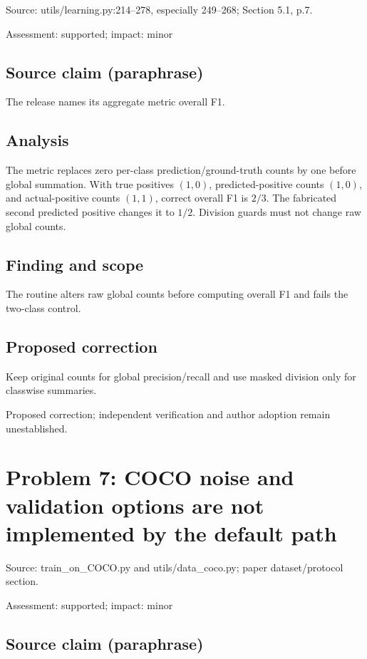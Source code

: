 \documentclass[11pt]{article}
\begin{document}
Source: utils/learning.py:214–278, especially 249–268; Section 5.1, p.7.

Assessment: supported; impact: minor

\subsection*{Source claim (paraphrase)}

The release names its aggregate metric overall F1.

\subsection*{Analysis}

The metric replaces zero per-class prediction/ground-truth counts by one before global summation. With true positives \((1,0)\), predicted-positive counts \((1,0)\), and actual-positive counts \((1,1)\), correct overall F1 is \(2/3\). The fabricated second predicted positive changes it to \(1/2\). Division guards must not change raw global counts.

\subsection*{Finding and scope}

The routine alters raw global counts before computing overall F1 and fails the two-class control.

\subsection*{Proposed correction}

Keep original counts for global precision/recall and use masked division only for classwise summaries.

Proposed correction; independent verification and author adoption remain unestablished.

\section*{Problem 7: COCO noise and validation options are not implemented by the default path}

Source: train\_on\_COCO.py and utils/data\_coco.py; paper dataset/protocol section.

Assessment: supported; impact: minor

\subsection*{Source claim (paraphrase)}
\end{document}
